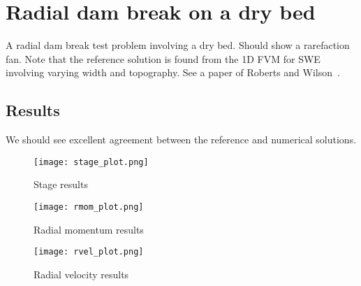
\section{Radial dam break on a dry bed}

A radial dam break test problem involving a dry bed. Should show a rarefaction fan. Note that the reference solution is found from the 1D FVM for SWE involving varying width and topography. See a paper of Roberts and Wilson~\cite{RW2011}.


\subsection{Results}

We should see excellent agreement between the reference and numerical solutions.

\begin{figure}
\begin{center}
\texttt{[image: stage\_plot.png]}
\end{center}
\caption{Stage results}
\end{figure}


\begin{figure}
\begin{center}
\texttt{[image: rmom\_plot.png]}
\end{center}
\caption{Radial momentum results}
\end{figure}


\begin{figure}
\begin{center}
\texttt{[image: rvel\_plot.png]}
\end{center}
\caption{Radial velocity results}
\end{figure}


\endinput
